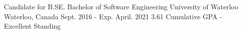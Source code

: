 

\begin{cventries}

  \cventry
    {Candidate for B.SE. Bachelor of Software Engineering} %
    {University of Waterloo} %
    {Waterloo, Canada} %
    {Sept. 2016 - Exp. April. 2021} %
    {3.61 Cumulative GPA - Excellent Standing}

\end{cventries}
